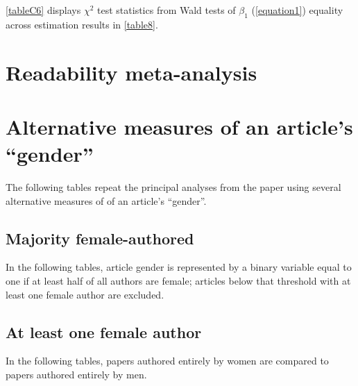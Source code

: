 \begin{appendices}
\autoref{tableC6} displays $\chi^2$ test statistics from Wald tests of $\beta_1$ (\autoref{equation1}) equality across estimation results in \autoref{table8}. 



\clearpage

\section{Readability meta-analysis}
\label{appendixmetaanalysis}

\section{Alternative measures of an article's ``gender''}
\label{appendixalternativemeasure}

The following tables repeat the principal analyses from the paper using several alternative measures of of an article's ``gender''.

\subsection{Majority female-authored}
\label{appendixmajoirty}

In the following tables, article gender is represented by a binary variable equal to one if at least half of all authors are female; articles below that threshold with at least one female author are excluded.











\clearpage

\subsection{At least one female author}
\label{appendixminority}

In the following tables, papers authored entirely by women are compared to papers authored entirely by men.


\end{appendices}
